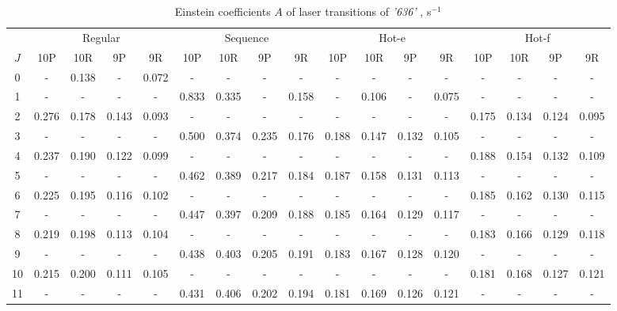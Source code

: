 \documentclass{report}
\begin{document}
\begin{appendices}
\begin{table}
\centering
\caption{Einstein coefficients $A$ of laser transitions of \textit{'636'} , s$^{-1}$}
\label{table:A636}
\scriptsize
\begin{tabular}{|c|cccc|cccc|cccc|cccc|}
\hline
& \multicolumn{4}{c|}{Regular}& \multicolumn{4}{c|}{Sequence}& \multicolumn{4}{c|}{Hot-e}& \multicolumn{4}{c|}{Hot-f}\\
$J$ & 10P & 10R & 9P & 9R & 10P & 10R & 9P & 9R & 10P & 10R & 9P & 9R & 10P & 10R & 9P & 9R\\ 
\hline
0  &   -   & 0.138 &   -   & 0.072 &   -   &   -   &   -   &   -   &   -   &   -   &   -   &   -   &   -   &   -   &   -   &   -  \\
1  &   -   &   -   &   -   &   -   & 0.833 & 0.335 &   -   & 0.158 &   -   & 0.106 &   -   & 0.075 &   -   &   -   &   -   &   -  \\
2  & 0.276 & 0.178 & 0.143 & 0.093 &   -   &   -   &   -   &   -   &   -   &   -   &   -   &   -   & 0.175 & 0.134 & 0.124 & 0.095\\
3  &   -   &   -   &   -   &   -   & 0.500 & 0.374 & 0.235 & 0.176 & 0.188 & 0.147 & 0.132 & 0.105 &   -   &   -   &   -   &   -  \\
4  & 0.237 & 0.190 & 0.122 & 0.099 &   -   &   -   &   -   &   -   &   -   &   -   &   -   &   -   & 0.188 & 0.154 & 0.132 & 0.109\\
5  &   -   &   -   &   -   &   -   & 0.462 & 0.389 & 0.217 & 0.184 & 0.187 & 0.158 & 0.131 & 0.113 &   -   &   -   &   -   &   -  \\
6  & 0.225 & 0.195 & 0.116 & 0.102 &   -   &   -   &   -   &   -   &   -   &   -   &   -   &   -   & 0.185 & 0.162 & 0.130 & 0.115\\
7  &   -   &   -   &   -   &   -   & 0.447 & 0.397 & 0.209 & 0.188 & 0.185 & 0.164 & 0.129 & 0.117 &   -   &   -   &   -   &   -  \\
8  & 0.219 & 0.198 & 0.113 & 0.104 &   -   &   -   &   -   &   -   &   -   &   -   &   -   &   -   & 0.183 & 0.166 & 0.129 & 0.118\\
9  &   -   &   -   &   -   &   -   & 0.438 & 0.403 & 0.205 & 0.191 & 0.183 & 0.167 & 0.128 & 0.120 &   -   &   -   &   -   &   -  \\
10 & 0.215 & 0.200 & 0.111 & 0.105 &   -   &   -   &   -   &   -   &   -   &   -   &   -   &   -   & 0.181 & 0.168 & 0.127 & 0.121\\
11 &   -   &   -   &   -   &   -   & 0.431 & 0.406 & 0.202 & 0.194 & 0.181 & 0.169 & 0.126 & 0.121 &   -   &   -   &   -   &   -  \\

\end{tabular}
\end{table}
\end{appendices}
\end{document}
